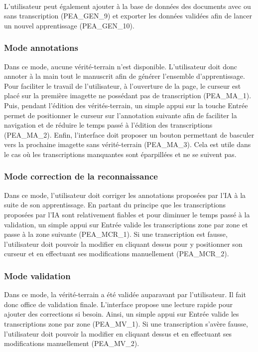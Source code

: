 \paragraph{}

L’utilisateur peut également ajouter à la base de données des documents avec ou sans transcription (PEA_GEN_9) et exporter les données validées afin de lancer un nouvel apprentissage (PEA_GEN_10).

\subsubsection{Mode annotations}

Dans ce mode, aucune vérité-terrain n’est disponible. L’utilisateur doit donc annoter à la main tout le manuscrit afin de générer l’ensemble d’apprentissage. Pour faciliter le travail de l’utilisateur, à l’ouverture de la page, le curseur est placé sur la première imagette ne possédant pas de transcription (PEA_MA_1). Puis, pendant l’édition des vérités-terrain, un simple appui sur la touche Entrée permet de positionner le curseur sur l’annotation suivante afin de faciliter la navigation et de réduire le temps passé à l’édition des transcriptions (PEA_MA_2). Enfin, l’interface doit proposer un bouton permettant de basculer vers la prochaine imagette sans vérité-terrain (PEA_MA_3). Cela est utile dans le cas où les transcriptions manquantes sont éparpillées et ne se suivent pas.

\subsubsection{Mode correction de la reconnaissance}

Dans ce mode, l’utilisateur doit corriger les annotations proposées par l’IA à la suite de son apprentissage. En partant du principe que les transcriptions proposées par l’IA sont relativement fiables et pour diminuer le temps passé à la validation, un simple appui sur Entrée valide les transcriptions zone par zone et passe à la zone suivante (PEA_MCR_1). Si une transcription est fausse, l’utilisateur doit pouvoir la modifier en cliquant dessus pour y positionner son curseur et en effectuant ses modifications manuellement (PEA_MCR_2).

\subsubsection{Mode validation}

Dans ce mode, la vérité-terrain a été validée auparavant par l’utilisateur. Il fait donc office de validation finale. L’interface propose une lecture rapide pour ajouter des corrections si besoin. Ainsi, un simple appui sur Entrée valide les transcriptions zone par zone (PEA_MV_1). Si une transcription s’avère fausse, l’utilisateur doit pouvoir la modifier en cliquant dessus et en effectuant ses modifications manuellement (PEA_MV_2).

